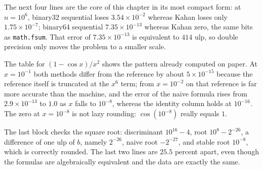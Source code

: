 The next four lines are the core of this chapter in its most compact form: at
$n=10^{6}$, binary32 sequential loses $3.54\times10^{-2}$ whereas Kahan loses only
$1.75\times10^{-7}$; binary64 sequential $7.35\times10^{-13}$ whereas Kahan zero, the
same bits as \texttt{math.fsum}. That error of $7.35\times10^{-13}$ is equivalent to
$414$ ulp, so double precision only moves the problem to a smaller scale.

The table for $(1-\cos x)/x^{2}$ shows the pattern already computed on paper. At
$x=10^{-1}$ both methods differ from the reference by about $5\times10^{-15}$ because the
reference itself is truncated at the $x^{6}$ term; from $x=10^{-2}$ on that reference is
far more accurate than the machine, and the error of the naive formula rises from
$2.9\times10^{-13}$ to $1.0$ as $x$ falls to $10^{-8}$, whereas the identity column holds
at $10^{-16}$. The zero at $x=10^{-8}$ is not lazy rounding: $\cos(10^{-8})$ really
equals $1$.

The last block checks the square root: discriminant $10^{16}-4$, root $10^{8}-2^{-26}$,
a difference of one ulp of $b$, namely $2^{-26}$, naive root $-2^{-27}$, and stable root
$10^{-8}$, which is correctly rounded. The last two lines
are $25.5$ percent apart, even though the formulas are algebraically equivalent and the
data are exactly the same.

